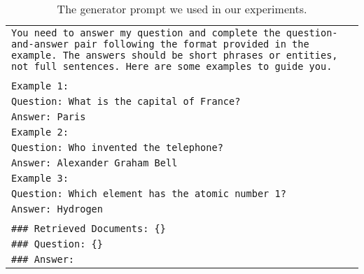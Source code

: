 \begin{table*}[ht]
\small
\centering
\begin{tabular}{|p{14.5cm}|}
\hline
\texttt{You need to answer my question and complete the question-and-answer pair following the format provided in the example. The answers should be short phrases or entities, not full sentences. Here are some examples to guide you.} \\
\\
\texttt{Example 1:}\\
\texttt{Question: What is the capital of France?}\\
\texttt{Answer: Paris}\\
\texttt{Example 2:}\\
\texttt{Question: Who invented the telephone?}\\
\texttt{Answer: Alexander Graham Bell}\\
\texttt{Example 3:}\\
\texttt{Question: Which element has the atomic number 1?}\\
\texttt{Answer: Hydrogen}\\
\\

\texttt{\#\#\# Retrieved Documents: \{\}} \\
\texttt{\#\#\# Question: \{\}} \\
\texttt{\#\#\# Answer:} \\
\hline
\end{tabular}
\caption{The generator prompt we used in our experiments.}
\label{tab:generator_prompt}
\end{table*}